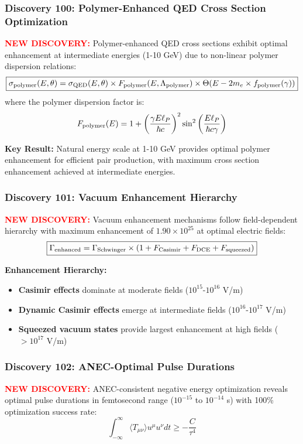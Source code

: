 \documentclass[11pt]{article}
\begin{document}
\subsubsection*{Discovery 100: Polymer-Enhanced QED Cross Section Optimization}
\textcolor{red}{\textbf{NEW DISCOVERY:}} Polymer-enhanced QED cross sections exhibit optimal enhancement at intermediate energies (1-10 GeV) due to non-linear polymer dispersion relations:
\[
  \boxed{\sigma_{\rm polymer}(E,\theta) = \sigma_{\rm QED}(E,\theta) \times F_{\rm polymer}(E,\Lambda_{\rm polymer}) \times \Theta(E - 2m_e \times f_{\rm polymer}(\gamma))}
\]
where the polymer dispersion factor is:
\begin{align*}
  F_{\rm polymer}(E) = 1 + \left(\frac{\gamma E \ell_P}{\hbar c}\right)^2 \sin^2\left(\frac{E \ell_P}{\hbar c \gamma}\right)
\end{align*}

\textbf{Key Result:} Natural energy scale at 1-10 GeV provides optimal polymer enhancement for efficient pair production, with maximum cross section enhancement achieved at intermediate energies.

\subsubsection*{Discovery 101: Vacuum Enhancement Hierarchy}
\textcolor{red}{\textbf{NEW DISCOVERY:}} Vacuum enhancement mechanisms follow field-dependent hierarchy with maximum enhancement of $1.90 \times 10^{25}$ at optimal electric fields:
\begin{align*}
  \boxed{\Gamma_{\rm enhanced} = \Gamma_{\rm Schwinger} \times (1 + F_{\rm Casimir} + F_{\rm DCE} + F_{\rm squeezed})}
\end{align*}

\textbf{Enhancement Hierarchy:}
\begin{itemize}
  \item \textbf{Casimir effects} dominate at moderate fields ($10^{15}$-$10^{16}$ V/m)
  \item \textbf{Dynamic Casimir effects} emerge at intermediate fields ($10^{16}$-$10^{17}$ V/m) 
  \item \textbf{Squeezed vacuum states} provide largest enhancement at high fields ($>10^{17}$ V/m)
\end{itemize}

\subsubsection*{Discovery 102: ANEC-Optimal Pulse Durations}
\textcolor{red}{\textbf{NEW DISCOVERY:}} ANEC-consistent negative energy optimization reveals optimal pulse durations in femtosecond range ($10^{-15}$ to $10^{-14}$ s) with 100\% optimization success rate:
\[
  \boxed{\int_{-\infty}^{\infty} \langle T_{\mu\nu} \rangle u^\mu u^\nu dt \geq -\frac{C}{\tau^4}}
\]
\end{document}
